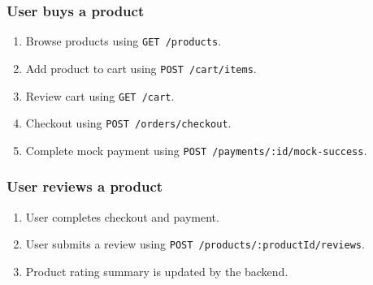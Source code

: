 \subsubsection{User buys a product}

\begin{enumerate}
    \item Browse products using \texttt{GET /products}.
    \item Add product to cart using \texttt{POST /cart/items}.
    \item Review cart using \texttt{GET /cart}.
    \item Checkout using \texttt{POST /orders/checkout}.
    \item Complete mock payment using \texttt{POST /payments/:id/mock-success}.
\end{enumerate}

\subsubsection{User reviews a product}

\begin{enumerate}
    \item User completes checkout and payment.
    \item User submits a review using \texttt{POST /products/:productId/reviews}.
    \item Product rating summary is updated by the backend.
\end{enumerate}
